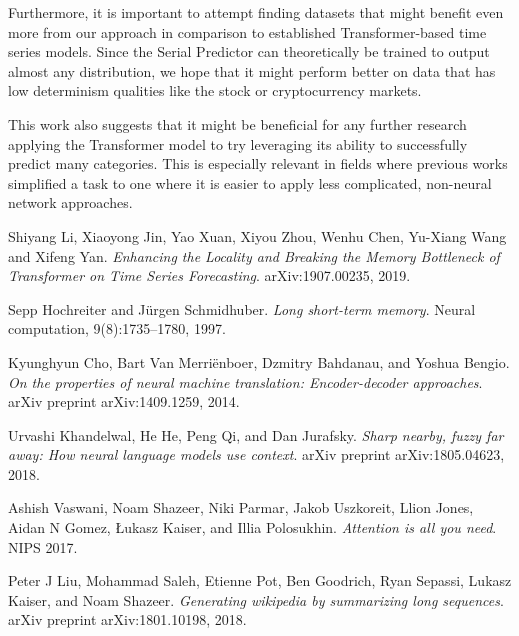 \documentclass[en]{pracamgr}
\begin{document}
Furthermore, it is important to attempt finding datasets that might benefit even more from our approach in comparison to established Transformer-based time series models. Since the Serial Predictor can theoretically be trained to output almost any distribution, we hope that it might perform better on data that has low determinism qualities like the stock or cryptocurrency markets.

This work also suggests that it might be beneficial for any further research applying the Transformer model to try leveraging its ability to successfully predict many categories.
This is especially relevant in fields where previous works simplified a task to one where it is easier to apply less complicated, non-neural network approaches.


\begin{thebibliography}{99}

%


%
 Shiyang Li, Xiaoyong Jin, Yao Xuan, Xiyou Zhou, Wenhu Chen, Yu-Xiang Wang and Xifeng Yan. \textit{Enhancing the Locality and Breaking the Memory
	Bottleneck of Transformer on Time Series Forecasting}. arXiv:1907.00235, 2019.

 Sepp Hochreiter and Jürgen Schmidhuber. \textit{Long short-term memory}. Neural computation, 9(8):1735–1780, 1997.

 Kyunghyun Cho, Bart Van Merriënboer, Dzmitry Bahdanau, and Yoshua Bengio. \textit{On the properties of neural machine translation: Encoder-decoder approaches}. arXiv preprint arXiv:1409.1259, 2014.

 Urvashi Khandelwal, He He, Peng Qi, and Dan Jurafsky. \textit{Sharp nearby, fuzzy far away: How neural language models use context}. arXiv preprint arXiv:1805.04623, 2018.

 Ashish Vaswani, Noam Shazeer, Niki Parmar, Jakob Uszkoreit, Llion Jones, Aidan N Gomez, Łukasz
Kaiser, and Illia Polosukhin. \textit{Attention is all you need}. NIPS 2017.

 Peter J Liu, Mohammad Saleh, Etienne Pot, Ben Goodrich, Ryan Sepassi, Lukasz Kaiser, and Noam
Shazeer. \textit{Generating wikipedia by summarizing long sequences}. arXiv preprint arXiv:1801.10198, 2018.


\end{thebibliography}
\end{document}
